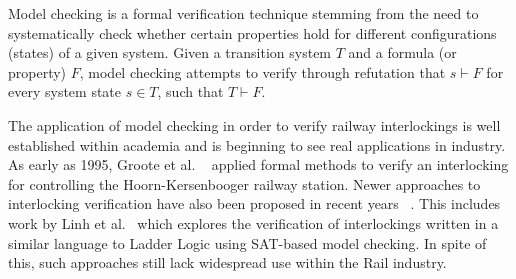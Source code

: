 \documentclass[conference,compsoc]{IEEEtran}
\begin{document}


Model checking is a formal verification technique stemming from the need to systematically
check whether certain properties hold for different configurations (states) of a given system.
Given a transition system $T$ and a formula (or property) $F$, model checking attempts to verify through refutation that $s \vdash F$ for every system state $s \in T$, such that $T \vdash F$. 

The application of model checking in order to verify railway interlockings is well established within
academia and is beginning to see real applications in industry. As early as 1995, Groote
et al. ~\cite{groote1995safety} applied formal methods to verify an interlocking for controlling the Hoorn-Kersenbooger railway station. Newer approaches to interlocking verification have also been proposed in recent
years ~\cite{fantechi2012some, ferrari2011model, haxthausen2008modelling}. This includes work by Linh et al.~\cite{} which explores the verification
of interlockings written in a similar language to Ladder Logic using SAT-based model
checking. In spite of this, such approaches still lack widespread use within the Rail industry. 
\end{document}
